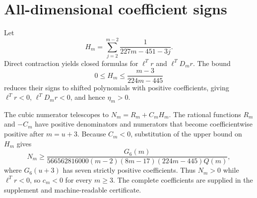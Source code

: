 \section*{All-dimensional coefficient signs}
Let
\[
H_m=\sum_{j=2}^{m-2}\frac1{227m-451-3j}.
\]
Direct contraction yields closed formulas for $\ell^Tr$ and $\ell^TD_mr$.  The bound
\[
0\le H_m\le\frac{m-3}{224m-445}
\]
reduces their signs to shifted polynomials with positive coefficients, giving $\ell^Tr<0$, $\ell^TD_mr<0$, and hence $\eta_m>0$.

The cubic numerator telescopes to $N_m=R_m+C_mH_m$.  The rational functions $R_m$ and $-C_m$ have positive denominators and numerators that become coefficientwise positive after $m=u+3$.  Because $C_m<0$, substitution of the upper bound on $H_m$ gives
\[
N_m\ge\frac{G_6(m)}{566562816000(m-2)(8m-17)(224m-445)Q(m)},
\]
where $G_6(u+3)$ has seven strictly positive coefficients.  Thus $N_m>0$ while $\ell^Tr<0$, so $c_m<0$ for every $m\ge3$.  The complete coefficients are supplied in the supplement and machine-readable certificate.
